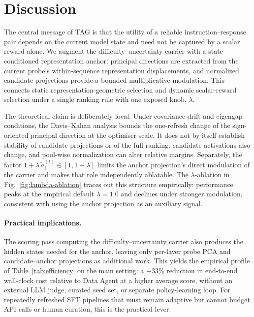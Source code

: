 \section{Discussion}
\label{sec:discussion}

The central message of \textsc{TAG} is that the utility of a reliable
instruction--response pair depends on the current model state and need
not be captured by a scalar reward alone. We augment the
difficulty--uncertainty carrier with a state-conditioned representation
anchor: principal directions are extracted from the current probe's
within-sequence representation displacements, and normalized candidate
projections provide a bounded multiplicative modulation. This connects
static representation-geometric selection and dynamic scalar-reward
selection under a single ranking rule with one exposed knob,
\(\lambda\).

The theoretical claim is deliberately local. Under covariance-drift
and eigengap conditions, the Davis--Kahan analysis bounds the
one-refresh change of the sign-oriented principal direction at the
optimiser scale. It does not by itself establish stability of candidate
projections or of the full ranking: candidate activations also change,
and pool-wise normalization can alter relative margins. Separately,
the factor
\(1+\lambda\,\widetilde a_i^{(t)}\in[1,1{+}\lambda]\) limits the
anchor projection's direct modulation of the carrier and makes that
role independently ablatable.
The \(\lambda\)-ablation in Fig.~\ref{fig:lambda-ablation} traces out
this structure empirically: performance peaks at the empirical default
\(\lambda{=}1.0\) and declines under stronger modulation, consistent
with using the anchor projection as an auxiliary signal.

\paragraph{Practical implications.}
The scoring pass computing the difficulty--uncertainty carrier also
produces the hidden states needed for the anchor, leaving only
per-layer probe PCA and candidate--anchor projections as additional
work. This yields the empirical profile of Table~\ref{tab:efficiency}
on the main setting: a $-33\%$ reduction in end-to-end wall-clock cost
relative to Data Agent at a higher average score, without an external
LLM judge, curated seed set, or separate policy-learning loop. For
repeatedly refreshed SFT pipelines that must
remain adaptive but cannot budget API calls or human curation, this is
the practical lever.

